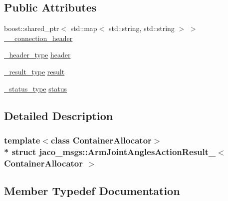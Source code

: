 \subsection*{Public Attributes}
\begin{DoxyCompactItemize}
\item 
boost\+::shared\+\_\+ptr$<$ std\+::map$<$ std\+::string, std\+::string $>$ $>$ \hyperlink{structjaco__msgs_1_1ArmJointAnglesActionResult___a119722093e137ecf8e7c6793917312f5}{\+\_\+\+\_\+connection\+\_\+header}
\item 
\hyperlink{structjaco__msgs_1_1ArmJointAnglesActionResult___a142970b220d568f61b0c132b07053d54}{\+\_\+header\+\_\+type} \hyperlink{structjaco__msgs_1_1ArmJointAnglesActionResult___a079944c74fedafa50405d3b8c9631a84}{header}
\item 
\hyperlink{structjaco__msgs_1_1ArmJointAnglesActionResult___a50db46393a0ea3c38ea8de5debd933c7}{\+\_\+result\+\_\+type} \hyperlink{structjaco__msgs_1_1ArmJointAnglesActionResult___a7d2ea6532c4fe6e71f98b67a55df9d86}{result}
\item 
\hyperlink{structjaco__msgs_1_1ArmJointAnglesActionResult___a55b4d92b3d825dc61be7afb680264c3d}{\+\_\+status\+\_\+type} \hyperlink{structjaco__msgs_1_1ArmJointAnglesActionResult___abcee28ae9e735f3212832991bce38b20}{status}
\end{DoxyCompactItemize}


\subsection{Detailed Description}
\subsubsection*{template$<$class Container\+Allocator$>$\\*
struct jaco\+\_\+msgs\+::\+Arm\+Joint\+Angles\+Action\+Result\+\_\+$<$ Container\+Allocator $>$}



\subsection{Member Typedef Documentation}
